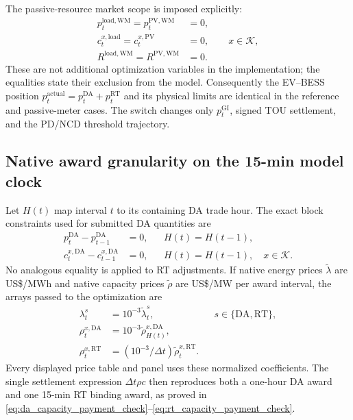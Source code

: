 \documentclass[final,5p,times]{elsarticle}
\newcommand{\dt}{\Delta t}
\newcommand{\DA}{\mathrm{DA}}
\newcommand{\RT}{\mathrm{RT}}
\newcommand{\GI}{\mathrm{GI}}
\newcommand{\PV}{\mathrm{PV}}
\newcommand{\WM}{\mathrm{WM}}
\newcommand{\actual}{\mathrm{actual}}
\newcommand{\load}{\mathrm{load}}
\newcommand{\calK}{\mathcal{K}}
\begin{document}
The passive-resource market scope is imposed explicitly:
\begin{align}
p_t^{\load,\WM}=p_t^{\PV,\WM}&=0,\label{eq:app_passive_wm_energy_zero}\\
c_t^{x,\load}=c_t^{x,\PV}&=0,
\qquad x\in\calK,\label{eq:app_passive_as_zero}\\
R^{\load,\WM}=R^{\PV,\WM}&=0.\label{eq:app_passive_wm_revenue_zero}
\end{align}
These are not additional optimization variables in the implementation; the
equalities state their exclusion from the model. Consequently the EV--BESS
position $p_t^{\actual}=p_t^{\DA}+p_t^{\RT}$ and its physical limits are
identical in the reference and passive-meter cases. The switch changes only
$p_t^{\GI}$, signed TOU settlement, and the PD/NCD threshold trajectory.

\subsection{Native award granularity on the 15-min model clock}
Let $H(t)$ map interval $t$ to its containing DA trade hour. The exact block
constraints used for submitted DA quantities are
\begin{align}
p_t^{\DA}-p_{t-1}^{\DA}&=0,
&&H(t)=H(t-1),\label{eq:app_da_energy_hourly_blocks}\\
c_t^{x,\DA}-c_{t-1}^{x,\DA}&=0,
&&H(t)=H(t-1),\quad x\in\calK.
\label{eq:app_da_hourly_blocks}
\end{align}
No analogous equality is applied to RT adjustments. If native energy prices
$\widetilde\lambda$ are US\$/MWh and native capacity prices
$\widetilde\rho$ are US\$/MW per award interval, the arrays passed to the
optimization are
\begin{align}
\lambda_t^{s}&=10^{-3}\widetilde\lambda_t^{s},
&&s\in\{\DA,\RT\},\label{eq:app_lmp_units}\\
\rho_t^{x,\DA}&=10^{-3}\widetilde\rho_{H(t)}^{x,\DA},
&&\label{eq:app_da_as_units}\\
\rho_t^{x,\RT}&=(10^{-3}/\dt)\widetilde\rho_t^{x,\RT}.
&&\label{eq:app_rt_as_units}
\end{align}
Every displayed price table and panel uses these normalized coefficients. The
single settlement expression $\dt\rho c$ then reproduces both a one-hour DA
award and one 15-min RT binding award, as proved in
\eqref{eq:da_capacity_payment_check}--\eqref{eq:rt_capacity_payment_check}.
\end{document}
